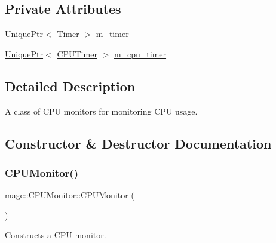 \subsection*{Private Attributes}
\begin{DoxyCompactItemize}
\item 
\hyperlink{namespacemage_a3316d7143a973e37adf1110f2e80ca31}{Unique\+Ptr}$<$ \hyperlink{classmage_1_1_timer}{Timer} $>$ \hyperlink{classmage_1_1_c_p_u_monitor_a5d24b6b9d684a6d0c34175052a8ac850}{m\+\_\+timer}
\item 
\hyperlink{namespacemage_a3316d7143a973e37adf1110f2e80ca31}{Unique\+Ptr}$<$ \hyperlink{classmage_1_1_c_p_u_timer}{C\+P\+U\+Timer} $>$ \hyperlink{classmage_1_1_c_p_u_monitor_a925f9d2366d798f2dba783a3ab25f651}{m\+\_\+cpu\+\_\+timer}
\end{DoxyCompactItemize}


\subsection{Detailed Description}
A class of C\+PU monitors for monitoring C\+PU usage. 

\subsection{Constructor \& Destructor Documentation}
\hypertarget{classmage_1_1_c_p_u_monitor_a06f9aa6e78b6659617345784f874dec6}{}\label{classmage_1_1_c_p_u_monitor_a06f9aa6e78b6659617345784f874dec6} 
\subsubsection{\texorpdfstring{C\+P\+U\+Monitor()}{CPUMonitor()}\hspace{0.1cm}{\footnotesize\ttfamily [1/3]}}
{\footnotesize\ttfamily mage\+::\+C\+P\+U\+Monitor\+::\+C\+P\+U\+Monitor (\begin{DoxyParamCaption}{ }\end{DoxyParamCaption})}

Constructs a C\+PU monitor. \hypertarget{classmage_1_1_c_p_u_monitor_a381bdfa95b34c591c6fbdb184e889f88}{}\label{classmage_1_1_c_p_u_monitor_a381bdfa95b34c591c6fbdb184e889f88} 
